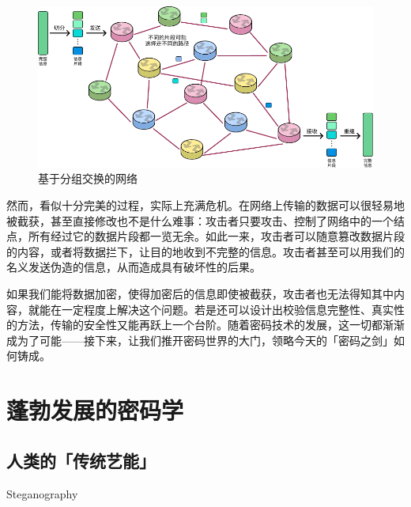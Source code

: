 \begin{figure}[htb!]
  \centering
  \includegraphics[width=.9\textwidth]{assets/surpass/Packet_routing.pdf}
  \caption{基于分组交换的网络}
  \label{fig:Packet_routing}
\end{figure}

然而，看似十分完美的过程，实际上充满危机。在网络上传输的数据可以很轻易地被截获，甚至直接修改也不是什么难事：攻击者只要攻击、控制了网络中的一个结点，所有经过它的数据片段都一览无余。如此一来，攻击者可以随意篡改数据片段的内容，或者将数据拦下，让目的地收到不完整的信息。攻击者甚至可以用我们的名义发送伪造的信息，从而造成具有破坏性的后果。

如果我们能将数据加密，使得加密后的信息即使被截获，攻击者也无法得知其中内容，就能在一定程度上解决这个问题。若是还可以设计出校验信息完整性、真实性的方法，传输的安全性又能再跃上一个台阶。随着密码技术的发展，这一切都渐渐成为了可能——接下来，让我们推开密码世界的大门，领略今天的「密码之剑」如何铸成。

\section{蓬勃发展的密码学}

\subsection{人类的「传统艺能」}

{
  \centering\vspace*{-4pt}
  \fontsize{5pt}{6pt}\selectfont\color{black!10!white}
  S\hspace{\fill}t\hspace{\fill}e\hspace{\fill}g\hspace{\fill}a\hspace{\fill}n\hspace{\fill}o\hspace{\fill}g\hspace{\fill}r\hspace{\fill}a\hspace{\fill}p\hspace{\fill}h\hspace{\fill}y\par
  \vspace*{-4pt}
}


